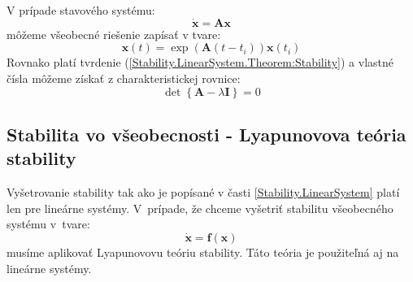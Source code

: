 \documentclass[a4paper, 10pt, ]{article}
\begin{document}
V prípade stavového systému:
\begin{equation}
    \dot{\bm{x}} = \bm{A} \bm{x}
\end{equation}
môžeme všeobecné riešenie zapísať v tvare:
\begin{equation}
    \bm{x}(t) = \exp(\bm{A} (t - t_i)) \bm{x}(t_i)
\end{equation}
Rovnako platí tvrdenie (\ref{Stability.LinearSystem.Theorem:Stability}) a vlastné čísla môžeme získať z charakteristickej rovnice:
\begin{equation}
    \det \left\{ \bm{A} - \lambda \bm{I} \right\} = 0
\end{equation} 


\subsection{Stabilita vo všeobecnosti - Lyapunovova teória stability}

Vyšetrovanie stability tak ako je popísané v časti \ref{Stability.LinearSystem} platí len pre lineárne systémy. V~prípade, že chceme vyšetriť stabilitu všeobecného systému v~tvare: 
\begin{equation}
    \label{Stability.Lyapunov.Equation:System}
    \dot{\bm{x}} = \bm{f}(\bm{x})
\end{equation}
musíme aplikovať Lyapunovovu teóriu stability. Táto teória je použiteľná aj na lineárne systémy.
\end{document}
